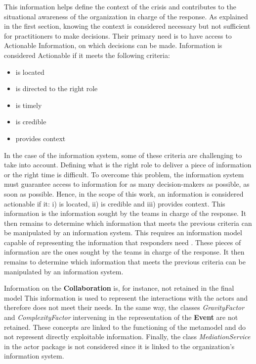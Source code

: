 This information helps define the context of the crisis and contributes to the situational awareness of the organization in charge of the response.
As explained in the first section, knowing the context is considered necessary but not sufficient for practitioners to make decisions.
Their primary need is to have access to Actionable Information, on which decisions can be made.
Information is considered Actionable if it meets the following criteria:

\begin{itemize}
    \item is located
    \item is directed to the right role
    \item is timely
    \item is credible
    \item provides context
\end{itemize}

In the case of the information system, some of these criteria are challenging to take into account.
Defining what is the right role to deliver a piece of information or the right time is difficult.
To overcome this problem, the information system must guarantee access to information for as many decision-makers as possible, as soon as possible.
Hence, in the scope of this work, an information is considered actionable if it: i) is located, ii) is credible and iii) provides context.
This information is the information sought by the teams in charge of the response.
It then remains to determine which information that meets the previous criteria can be manipulated by an information system.
This requires an information model capable of representing the information that responders need \parencite{comesBringingStructureDisaster2015}.
These pieces of information are the ones sought by the teams in charge of the response.
It then remains to determine which information that meets the previous criteria can be manipulated by an information system.

Information on the \textbf{Collaboration} is, for instance, not retained in the final model
This information is used to represent the interactions with the actors and therefore does not meet their needs.
In the same way, the classes \textit{GravityFactor} and \textit{ComplexityFactor} intervening in the representation of the \textbf{Event} are not retained.
These concepts are linked to the functioning of the \textcite{benabenMetamodelKnowledgeManagement2016} metamodel and do not represent directly exploitable information.
Finally, the class \textit{MediationService} in the actor package is not considered since it is linked to the organization's information system.

